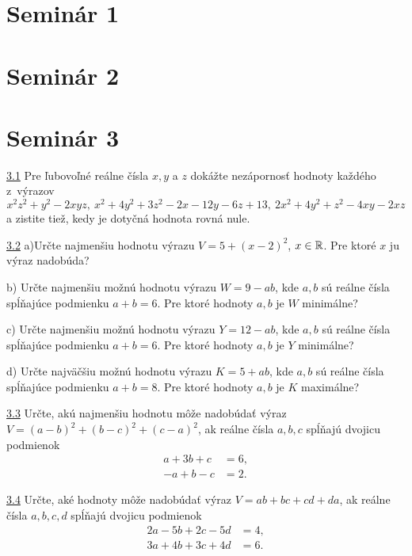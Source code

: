 \section*{Seminár 1}

\section*{Seminár 2}

\section*{Seminár 3}

\noindent \ul{3.1}  Pre ľubovoľné reálne čísla $x, y$ a $z$ dokážte nezápornosť hodnoty každého z~výrazov $$x^2z^2+ y^2- 2xyz, \ x^2+ 4y^2+ 3z^2- 2x - 12y - 6z + 13, \ 2x^2+ 4y^2 + z^2- 4xy - 2xz$$ a zistite tiež, kedy je dotyčná hodnota rovná nule.



\noindent \ul{3.2} 
a)Určte najmenšiu hodnotu výrazu $V = 5 + (x - 2)^2$, $x \in \mathbb{R}$. Pre ktoré $x$ ju výraz nadobúda?

b) Určte najmenšiu možnú hodnotu výrazu $W = 9 - ab$, kde $a, b$ sú reálne čísla spĺňajúce podmienku $a + b = 6$. Pre ktoré hodnoty $a, b$ je $W$ minimálne?

c) Určte najmenšiu možnú hodnotu výrazu $Y = 12-ab$, kde $a, b$ sú reálne čísla spĺňajúce podmienku $a + b = 6$. Pre ktoré hodnoty $a, b$ je $Y$ minimálne?

d) Určte najväčšiu možnú hodnotu výrazu $K = 5 + ab$, kde $a, b$ sú reálne čísla spĺňajúce podmienku $a + b = 8$. Pre ktoré hodnoty $a, b$ je $K$ maximálne?




\noindent \ul{3.3}  Určte, akú najmenšiu hodnotu môže nadobúdať výraz $V = (a-b)^2 +(b-c)^2 +(c-a)^2$, ak reálne čísla $a, b, c$ spĺňajú dvojicu podmienok
\begin{align*}
a + 3b + c &= 6,\\
-a + b - c &= 2.
\end{align*}




\noindent \ul{3.4}  Určte, aké hodnoty môže nadobúdať výraz $V = ab + bc + cd + da$, ak reálne čísla $a,b, c, d$ spĺňajú dvojicu podmienok
\begin{align*}
2a - 5b + 2c - 5d &= 4,\\
3a + 4b + 3c + 4d &= 6.
\end{align*}



